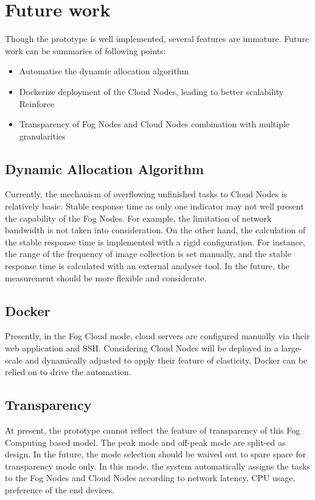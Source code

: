 \chapter{Future work} \label{chap:future}
Though the prototype is well implemented, several features are immature. Future work can be summaries of following points:

\begin{itemize}
    \item Automatise the dynamic allocation algorithm
    \item Dockerize deployment of the Cloud Nodes, leading to better scalability  Reinforce
    \item Transparency of Fog Nodes and Cloud Nodes combination with multiple granularities  
\end{itemize}
 
\section{Dynamic Allocation Algorithm}
Currently, the mechanism of overflowing unfinished tasks to Cloud Nodes is relatively basic. Stable response time as only one indicator may not well present the capability of the Fog Nodes. For example, the limitation of network bandwidth is not taken into consideration. On the other hand, the calculation of the stable response time is implemented with a rigid configuration. For instance, the range of the frequency of image collection is set manually, and the stable response time is calculated with an external analyser tool. In the future, the measurement should be more flexible and considerate.

\section{Docker}
Presently, in the Fog Cloud mode, cloud servers are configured manually via their web application and SSH. Considering Cloud Nodes will be deployed in a large-scale and dynamically adjusted to apply their feature of elasticity, Docker can be relied on to drive the automation.

\section{Transparency}
At present, the prototype cannot reflect the feature of transparency of this Fog Computing based model. The peak mode and off-peak mode are split-ed as design. In the future, the mode selection should be waived out to spare space for transparency mode only. In this mode, the system automatically assigns the tasks to the Fog Nodes and Cloud Nodes according to network latency, CPU usage, preference of the end devices.